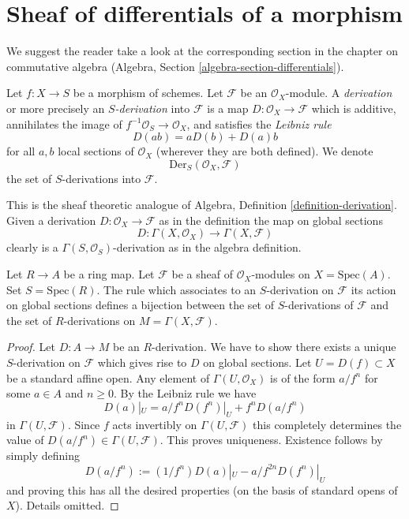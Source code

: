 \section{Sheaf of differentials of a morphism}
\label{section-sheaf-differentials}

\noindent
We suggest the reader take a look at the corresponding section
in the chapter on commutative algebra
(Algebra, Section \ref{algebra-section-differentials}).

\begin{definition}
\label{definition-derivation}
Let $f : X \to S$ be a morphism of schemes. Let $\mathcal{F}$
be an $\mathcal{O}_X$-module. A {\it derivation} or more precisely
an {\it $S$-derivation} into $\mathcal{F}$ is a map
$D : \mathcal{O}_X \to \mathcal{F}$ which is additive, annihilates
the image of $f^{-1}\mathcal{O}_S \to \mathcal{O}_X$, and satisfies the
{\it Leibniz rule}
$$
D(ab) = aD(b) + D(a)b
$$
for all $a, b$ local sections of $\mathcal{O}_X$
(wherever they are both defined). We denote
$$
\text{Der}_S(\mathcal{O}_X, \mathcal{F})
$$
the set of $S$-derivations into $\mathcal{F}$.
\end{definition}

\noindent
This is the sheaf theoretic analogue of
Algebra, Definition \ref{definition-derivation}.
Given a derivation $D : \mathcal{O}_X \to \mathcal{F}$
as in the definition the map on global sections
$$
D : \Gamma(X, \mathcal{O}_X) \longrightarrow \Gamma(X, \mathcal{F})
$$
clearly is a $\Gamma(S, \mathcal{O}_S)$-derivation as in
the algebra definition.

\begin{lemma}
\label{lemma-affine-case-derivation}
Let $R \to A$ be a ring map. Let $\mathcal{F}$
be a sheaf of $\mathcal{O}_X$-modules
on $X = \text{Spec}(A)$. Set $S = \text{Spec}(R)$.
The rule which associates to an $S$-derivation on $\mathcal{F}$
its action on global sections defines a bijection between
the set of $S$-derivations of $\mathcal{F}$ and the set of
$R$-derivations on $M = \Gamma(X, \mathcal{F})$.
\end{lemma}

\begin{proof}
Let $D : A \to M$ be an $R$-derivation. We have to show there exists
a unique $S$-derivation on $\mathcal{F}$ which gives rise to
$D$ on global sections. Let $U = D(f) \subset X$ be a standard affine open.
Any element of $\Gamma(U, \mathcal{O}_X)$ is of the form
$a/f^n$ for some $a \in A$ and $n \geq 0$. By the Leibniz rule
we have
$$
D(a)|_U = a/f^n D(f^n)|_U + f^n D(a/f^n)
$$
in $\Gamma(U, \mathcal{F})$. Since $f$ acts invertibly
on $\Gamma(U, \mathcal{F})$ this completely determines
the value of $D(a/f^n) \in \Gamma(U, \mathcal{F})$.
This proves uniqueness. Existence follows by simply defining
$$
D(a/f^n) := (1/f^n) D(a)|_U - a/f^{2n} D(f^n)|_U
$$
and proving this has all the desired properties (on the basis
of standard opens of $X$). Details omitted.
\end{proof}

